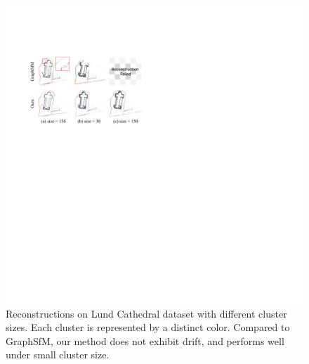 \documentclass[runningheads]{llncs}
\begin{document}
\begin{figure}[H]
    \centering
        \includegraphics[width=1\textwidth]{figs/cluster_size.pdf}
	\caption{Reconstructions on Lund Cathedral dataset with different cluster sizes. Each cluster is represented by a distinct color. Compared to GraphSfM, our method does not exhibit drift, and performs well under small cluster size.}
    \label{fig_cluster_size}
    \vspace{-1em}
\end{figure}



\end{document}
